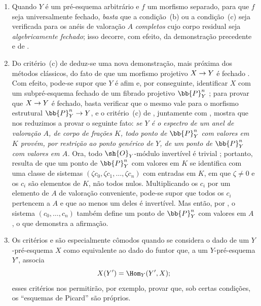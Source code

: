 \documentclass[oneside,10pt]{amsart}
\makeatletter
\newcommand{\ega@arrow}[2]{\mathchoice{#1}{#2}{#2}{#2}}
\renewcommand{\to}{\ega@arrow{\longrightarrow}{\rightarrow}}
\newcommand{\oldpage}[2][]{\marginnote{\normalfont\footnotesize\textbf{#1}~|~#2}\ignorespaces}
\let\EGAOriginalLabel\label
\renewcommand{\label}[1]{\phantomsection\EGAOriginalLabel{#1}}
\makeatother
\begin{document}
\begin{remarks}[7.3.9]
\label{II.7.3.9}
\begin{enumerate}
  \item[\rm{(i)}] Quando $Y$ é um pré-esquema arbitrário e $f$ um morfismo separado, para que $f$ seja universalmente fechado, \emph{basta} que a condição~(b) ou a condição~(c) seja verificada para os anéis de valoração $A$ \emph{completos} cujo corpo residual seja \emph{algebricamente fechado};
  isso decorre, com efeito, da demonstração precedente e de .

  \item[\rm{(ii)}] Do critério~(c) de  deduz-se uma nova demonstração, mais próxima dos métodos clássicos, do fato de que um morfismo projetivo $X\to Y$ é fechado .
  Com efeito, pode-se supor que $Y$ é afim e, por conseguinte, identificar $X$ com um subpré-esquema fechado de um fibrado projetivo $\bb{P}_Y^n$ ;
  para provar que $X\to Y$ é fechado, basta verificar que o mesmo vale para o morfismo estrutural $\bb{P}_Y^n\to Y$, e o critério~(c) de , juntamente com , mostra que nos reduzimos a provar o seguinte fato:
  \emph{se $Y$ é o espectro de um anel de valoração $A$, de corpo de frações $K$, todo ponto de $\bb{P}_Y^n$ com valores em $K$ provém, por restrição ao ponto genérico de $Y$, de um ponto de $\bb{P}_Y^n$ com valores em $A$.}
  Ora, todo $\sh{O}_Y$-módulo invertível é trivial ;
  portanto, resulta de  que um ponto de $\bb{P}_Y^n$ com valores em $K$ se identifica com uma classe de sistemas $(\zeta c_0,\zeta c_1,\ldots,\zeta c_n)$ com entradas em $K$, em que $\zeta\ne0$ e os $c_i$ são elementos de $K$, não todos nulos.
  Multiplicando os $c_i$ por um elemento de $A$ de
\oldpage[II]{146}
  valoração conveniente, pode-se supor que todos os $c_i$ pertencem a $A$ e que ao menos um deles é invertível.
  Mas então, por , o sistema $(c_0,\ldots,c_n)$ também define um ponto de $\bb{P}_Y^n$ com valores em $A$, o que demonstra a afirmação.

  \item[\rm{(iii)}] Os critérios  e  são especialmente cômodos quando se considera o dado de um $Y$-pré-esquema $X$ como equivalente ao dado do funtor que, a um $Y$-pré-esquema $Y'$, associa
  \[
    X(Y')=\Hom_Y(Y',X);
  \]
  esses critérios nos permitirão, por exemplo, provar que, sob certas condições, os ``esquemas de Picard'' são próprios.
\end{enumerate}
\end{remarks}
\end{document}
